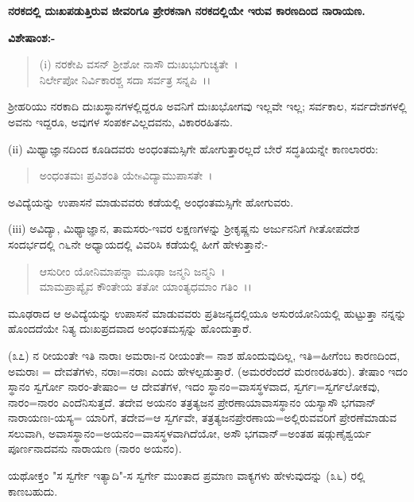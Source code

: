 \begin{center}
\textbf{ನರಕದಲ್ಲಿ ದುಃಖಪಡುತ್ತಿರುವ ಜೀವರಿಗೂ ಪ್ರೇರಕನಾಗಿ ನರಕದಲ್ಲಿಯೇ ಇರುವ ಕಾರಣದಿಂದ ನಾರಾಯಣ.}
\end{center}

\noindent
\textbf{ವಿಶೇಷಾಂಶ:-}

\begin{verse}
(i) ನರಕೇಪಿ ವಸನ್ ಶ‍್ರೀಶೋ ನಾಸೌ ದುಃಖಭುಗುಚ್ಯತೇ~।\\ ನಿರ್ಲೇಪೋ ನಿರ್ವಿಕಾರಶ್ಚ ಸದಾ ಸರ್ವತ್ರ ಸನ್ನಪಿ~।।
\end{verse}


ಶ‍್ರೀಹರಿಯು ನರಕಾದಿ ದುಃಖಸ್ಥಾನಗಳಲ್ಲಿದ್ದರೂ ಅವನಿಗೆ ದುಃಖಭೋಗವು ಇಲ್ಲವೇ ಇಲ್ಲ; ಸರ್ವಕಾಲ, ಸರ್ವದೇಶಗಳಲ್ಲಿ ಅವನು ಇದ್ದರೂ, ಅವುಗಳ ಸಂಪರ್ಕವಿಲ್ಲದವನು, ವಿಕಾರರಹಿತನು.

(ii) ಮಿಥ್ಯಾಜ್ಞಾನದಿಂದ ಕೂಡಿದವರು ಅಂಧಂತಮಸ್ಸಿಗೇ ಹೋಗುತ್ತಾರಲ್ಲದೆ ಬೇರೆ ಸದ್ಧತಿಯನ್ನೇ ಕಾಣಲಾರರು:

\begin{verse}
ಅಂಧಂತಮಃ ಪ್ರವಿಶಂತಿ ಯೇsವಿದ್ಯಾಮುಪಾಸತೇ~।
\end{verse}


ಅವಿದ್ಯೆಯನ್ನು ಉಪಾಸನೆ ಮಾಡುವವರು ಕಡೆಯಲ್ಲಿ ಅಂಧಂತಮಸ್ಸಿಗೇ ಹೋಗುವರು.

(iii) ಅವಿದ್ಯಾ, ಮಿಥ್ಯಾಜ್ಞಾನ, ತಾಮಸರು-ಇವರ ಲಕ್ಷಣಗಳನ್ನು ಶ‍್ರೀಕೃಷ್ಣನು ಅರ್ಜುನನಿಗೆ ಗೀತೋಪದೇಶ ಸಂದರ್ಭದಲ್ಲಿ ೧೬ನೇ ಅಧ್ಯಾಯದಲ್ಲಿ ವಿವರಿಸಿ ಕಡೆಯಲ್ಲಿ ಹೀಗೆ ಹೇಳುತ್ತಾನೆ:-

\begin{verse}
ಆಸುರೀಂ ಯೋನಿಮಾಪನ್ನಾ ಮೂಢಾ ಜನ್ಮನಿ ಜನ್ಮನಿ~।\\ ಮಾಮಪ್ರಾಪ್ಯೈವ ಕೌಂತೇಯ ತತೋ ಯಾಂತ್ಯಧಮಾಂ ಗತಿಂ~।।
\end{verse}

\noindent
ಮೂಢರಾದ ಆ ಅವಿದ್ಯೆಯನ್ನು ಉಪಾಸನೆ ಮಾಡುವವರು ಪ್ರತಿಜನ್ಯದಲ್ಲಿಯೂ ಅಸುರಯೋನಿಯಲ್ಲಿ ಹುಟ್ಟುತ್ತಾ ನನ್ನನ್ನು ಹೊಂದದೆಯೇ ನಿತ್ಯ ದುಃಖಪ್ರದವಾದ ಅಂಧಂತಮಸ್ಸನ್ನು ಹೊಂದುತ್ತಾರೆ.

(೩೭) ನ ರೀಯಂತೇ ಇತಿ ನಾರಾಃ ಅಮರಾಃ-ನ ರೀಯಂತೇ= ನಾಶ ಹೊಂದುವುದಿಲ್ಲ, ಇತಿ=ಹೀಗೆಂಬ ಕಾರಣದಿಂದ, ಅಮರಾಃ = ದೇವತೆಗಳು, ನರಾಃ=ನರಾಃ ಎಂದು ಹೇಳಲ್ಪಡುತ್ತಾರೆ. (ಅಮರರೆಂದರೆ ಮರಣರಹಿತರು). ತೇಷಾಂ ಇದಂ ಸ್ಥಾನಂ ಸ್ವರ್ಗೋ ನಾರಂ-ತೇಷಾಂ= ಆ ದೇವತೆಗಳ, ಇದಂ ಸ್ಥಾನಂ=ವಾಸಸ್ಥಳವಾದ, ಸ್ವರ್ಗಃ=ಸ್ವರ್ಗಲೋಕವು, ನಾರಂ=ನಾರಂ ಎಂದೆನಿಸುತ್ತದೆ. ತದೇವ ಅಯನಂ ತತ್ರತ್ಯಜನ ಪ್ರೇರಣಾಯಾವಾಸಸ್ಥಾನಂ ಯಸ್ಯಾಸೌ ಭಗವಾನ್ ನಾರಾಯಣಃ-ಯಸ್ಯ= ಯಾರಿಗೆ, ತದೇವ=ಆ ಸ್ವರ್ಗವೇ, ತತ್ರತ್ಯಜನಪ್ರೇರಣಾಯ=ಅಲ್ಲಿರುವವರಿಗೆ ಪ್ರೇರಣೆಮಾಡುವ ಸಲುವಾಗಿ, ಅವಾಸಸ್ಥಾನಂ=ಅಯನಂ=ವಾಸಸ್ಥಳವಾಗಿದೆಯೋ, ಅಸೌ ಭಗವಾನ್=ಅಂತಹ ಷಡ್ಗುಣೈಶ್ವರ್ಯ ಪೂರ್ಣನಾದವನು ನಾರಾಯಣ (ನಾರಂ ಅಯನಂ).

ಯಥೋಕ್ತಂ "ಸ ಸ್ವರ್ಗೇ ಇತ್ಯಾದಿ"-ಸ ಸ್ವರ್ಗೇ ಮುಂತಾದ ಪ್ರಮಾಣ ವಾಕ್ಯಗಳು ಹೇಳುವುದನ್ನು (೩೬) ರಲ್ಲಿ ಕಾಣಬಹುದು.


